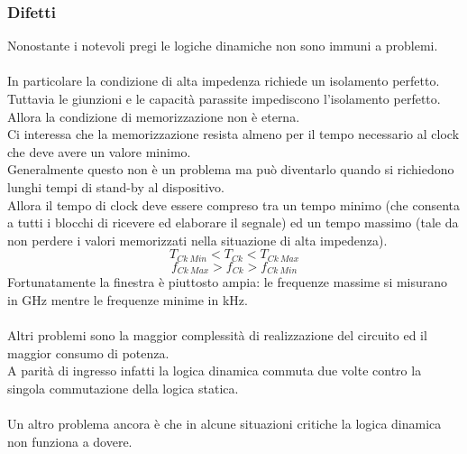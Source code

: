 \documentclass[../main.tex]{subfiles}
\begin{document}
	\subsubsection{Difetti}
	Nonostante i notevoli pregi le logiche dinamiche non sono immuni a problemi.\\\\
	In particolare la condizione di alta impedenza richiede un isolamento perfetto.\\
	Tuttavia le giunzioni e le capacità parassite impediscono l'isolamento perfetto.\\
	Allora la condizione di memorizzazione non è eterna.\\
	Ci interessa che la memorizzazione resista almeno per il tempo necessario al clock che deve avere un valore minimo.\\
	Generalmente questo non è un problema ma può diventarlo quando si richiedono lunghi tempi di stand-by al dispositivo.\\
	Allora il tempo di clock deve essere compreso tra un tempo minimo (che consenta a tutti i blocchi di ricevere ed elaborare il segnale) ed un tempo massimo (tale da non perdere i valori memorizzati nella situazione di alta impedenza).
	$$T_{Ck\ Min} < T_{Ck} < T_{Ck\ Max}$$
	$$f_{Ck\ Max} > f_{Ck} > f_{Ck\ Min}$$
	Fortunatamente la finestra è piuttosto ampia: le frequenze massime si misurano in GHz mentre le frequenze minime in kHz.\\\\
	Altri problemi sono la maggior complessità di realizzazione del circuito ed il maggior consumo di potenza.\\
	A parità di ingresso infatti la logica dinamica commuta due volte contro la singola commutazione della logica statica.\\\\
	Un altro problema ancora è che in alcune situazioni critiche la logica dinamica non funziona a dovere.
\end{document}
